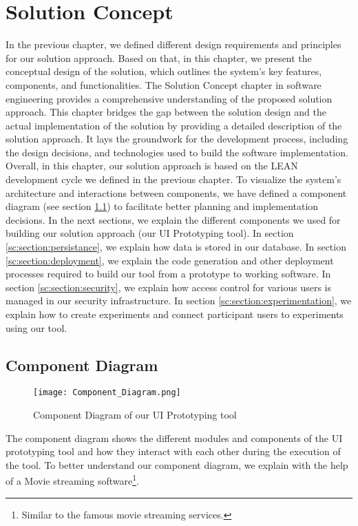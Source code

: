 
\chapter{Solution Concept}

\ifpdf
    \graphicspath{{Chapters/Solution-Concept/Figs/}{Chapters/Solution-Concept/Figs/}{Chapters/Solution-Concept/Figs/}}
\else
    \graphicspath{{Chapters/Solution-Concept/Figs/}{Chapters/Solution-Concept/Figs/}}
\fi
In the previous chapter, we defined different design requirements and principles for our solution approach. 
Based on that, in this chapter, we present the conceptual design of the solution, which outlines the system's key features, components, and functionalities. 
The Solution Concept chapter in software engineering provides a comprehensive understanding of the proposed solution approach. 
This chapter bridges the gap between the solution design and the actual implementation of the solution by providing a detailed description of the solution approach. 
It lays the groundwork for the development process, including the design decisions, and technologies used to build the software implementation. 
Overall, in this chapter, our solution approach is based on the LEAN development cycle we defined in the previous chapter.
To visualize the system's architecture and interactions between components, we have defined a component diagram (see section \ref{sc:section:componentD}) to facilitate better planning and implementation decisions.
In the next sections, we explain the different components we used for building our solution approach (our UI Prototyping tool). 
In section \ref{sc:section:persistance}, we explain how data is stored in our database. 
In section \ref{sc:section:deployment}, we explain the code generation and other deployment processes required to build our tool from a prototype to working software.
In section \ref{sc:section:security}, we explain how access control for various users is managed in our security infrastructure. 
In section \ref{sc:section:experimentation}, we explain how to create experiments and connect participant users to experiments using our tool. 

\section{Component Diagram}
\label{sc:section:componentD}
\begin{figure}[htbp!]
    \centering    
    \texttt{[image: Component\_Diagram.png]} 
    \caption[Component Diagram]{Component Diagram of our UI Prototyping tool}
    \label{fig:sc:componentD}
\end{figure}
The component diagram shows the different modules and components of the UI prototyping tool and how they interact with each other during the execution of the tool.
To better understand our component diagram, we explain with the help of a Movie streaming software\footnote{Similar to the famous movie streaming services.}.

